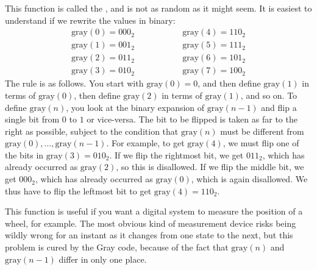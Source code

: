 \documentclass[a4paper]{book}
\theoremstyle{definition}
\begin{document}
\begin{background}
 This function is called the  ,
 and is not as random as it might seem.  It is easiest to understand
 if we rewrite the values in binary:
 \[ \begin{array}{lll}
     \text{gray}(0) = 000_2 & \hspace{4em} & \text{gray}(4) = 110_2 \\
     \text{gray}(1) = 001_2 &              & \text{gray}(5) = 111_2 \\
     \text{gray}(2) = 011_2 &              & \text{gray}(6) = 101_2 \\
     \text{gray}(3) = 010_2 &              & \text{gray}(7) = 100_2
    \end{array}
 \]
 The rule is as follows.  You start with $\text{gray}(0)=0$, and then
 define $\text{gray}(1)$ in terms of $\text{gray}(0)$, then define
 $\text{gray}(2)$ in terms of $\text{gray}(1)$, and so on.  To define
 $\text{gray}(n)$, you look at the binary expansion of
 $\text{gray}(n-1)$ and flip a single bit from $0$ to $1$ or
 vice-versa.  The bit to be flipped is taken as far to the right as
 possible, subject to the condition that $\text{gray}(n)$ must be
 different from $\text{gray}(0),\ldots,\text{gray}(n-1)$.  For
 example, to get $\text{gray}(4)$, we must flip one of the bits in
 $\text{gray}(3)=010_2$.  If we flip the rightmost bit, we get
 $011_2$, which has already occurred as $\text{gray}(2)$, so this is
 disallowed.  If we flip the middle bit, we get $000_2$, which has
 already occurred as $\text{gray}(0)$, which is again disallowed.  We
 thus have to flip the leftmost bit to get $\text{gray}(4)=110_2$.
 
 This function is useful if you want a digital system to measure the
 position of a wheel, for example.  The most obvious kind of
 measurement device risks being wildly wrong for an instant as it
 changes from one state to the next, but this problem is cured by the
 Gray code, because of the fact that $\text{gray}(n)$ and
 $\text{gray}(n-1)$ differ in only one place.
\end{background}
\end{document}
